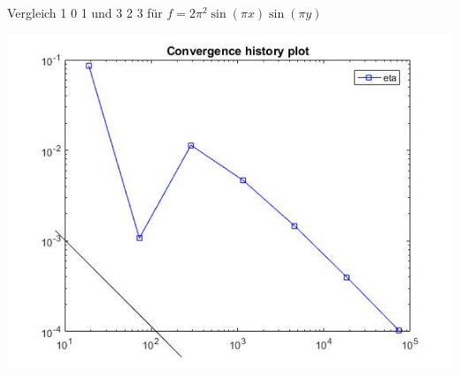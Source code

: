\documentclass[xcolor=svgnames,ngerman]{beamer}
\begin{document}
\begin{frame}{Vergleich 1 0 1 und 3 2 3 für $f=2\pi ^2 \sin (\pi x) \sin (\pi y)$}
\begin{center}
	\includegraphics[scale=0.25]{323plot.jpg}
\end{center}

\end{frame}	
\end{document}

